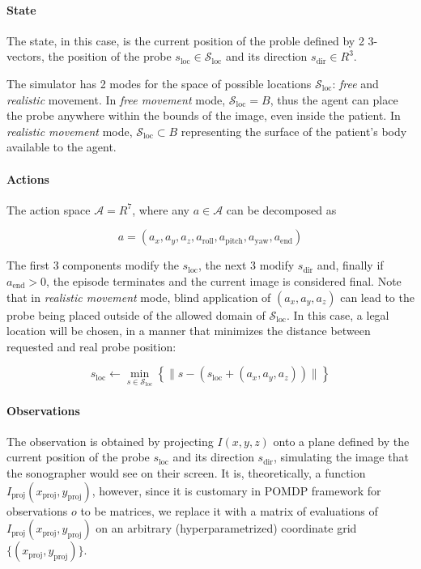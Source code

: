 \paragraph{State}

The state, in this case, is the current position of the proble defined by 2 3-vectors, the position of the probe $s_\text{loc} \in \mathcal{S}_\text{loc}$ and its direction $s_\text{dir} \in R^{3}$.

The simulator has 2 modes for the space of possible locations $\mathcal{S}_\text{loc}$: \emph{free} and \emph{realistic} movement.
In \emph{free movement} mode, $\mathcal{S}_\text{loc} = B$, thus the agent can place the probe anywhere within the bounds of the image, even inside the patient.
In \emph{realistic movement} mode, $\mathcal{S}_\text{loc} \subset B$ representing the surface of the patient's body available to the agent.

\paragraph{Actions}

The action space $\mathcal{A} = R^{7}$, where any $a \in \mathcal{A}$ can be decomposed as

\begin{equation}
    a = (a_{x} , a_{y} , a_{z} , a_\text{roll} , a_\text{pitch} , a_\text{yaw}, a_\text{end})
\end{equation}

The first 3 components modify the $s_\text{loc}$, the next 3 modify $s_\text{dir}$ and, finally if $a_\text{end} > 0$, the episode terminates and the current image is considered final.
Note that in \emph{realistic movement} mode, blind application of $(a_{x} , a_{y} , a_{z})$ can lead to the probe being placed outside of the allowed domain of $\mathcal{S}_\text{loc}$.
In this case, a legal location will be chosen, in a manner that minimizes the distance between requested and real probe position:

\begin{equation}
    s_\text{loc} \leftarrow \min_{s \in \mathcal{S}_\text{loc}} \left\{ \lVert s - (s_\text{loc} + (a_{x} , a_{y} , a_{z})) \rVert \right\}
\end{equation}

\paragraph{Observations}

The observation is obtained by projecting $I(x,y,z)$ onto a plane defined by the current position of the probe $s_\text{loc}$ and its direction $s_\text{dir}$, simulating the image that the sonographer would see on their screen.
It is, theoretically, a function $I_\text{proj}(x_\text{proj}, y_\text{proj})$, however, since it is customary in POMDP framework for observations $o$ to be matrices, we replace it with a matrix of evaluations of $I_\text{proj}(x_\text{proj}, y_\text{proj})$ on an arbitrary (hyperparametrized) coordinate grid $\{(x_\text{proj}, y_\text{proj})\}$.

